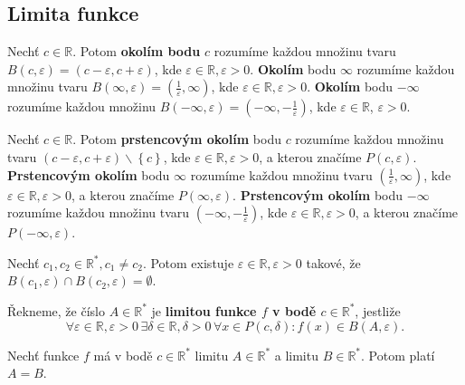 \subsection{Limita funkce}

\begin{definice}
	Nechť $c \in \mathbb R $. Potom \textbf{okolím bodu} $c$ rozumíme každou množinu tvaru
	$B(c, \varepsilon) = (c-\varepsilon, c+\varepsilon)$, kde $\varepsilon \in \mathbb R , \varepsilon > 0$.
	\textbf{Okolím} bodu $\infty$ rozumíme každou množinu tvaru $B(\infty, \varepsilon) = \left( \frac{1}{\varepsilon}, \infty \right ) $,
	kde $\varepsilon \in \mathbb R , \varepsilon > 0$. \textbf{Okolím} bodu $-\infty$
	rozumíme každou množinu $B(-\infty, \varepsilon)= \left( -\infty, -\frac{1}{\varepsilon} \right ) $, kde $\varepsilon \in \mathbb R $, $\varepsilon >0$.
\end{definice}

\begin{definice}
	Nechť $c \in \mathbb R $. Potom \textbf{prstencovým okolím} bodu $c$ rozumíme
	každou množinu tvaru $(c-\varepsilon, c+\varepsilon) \smallsetminus \left \{ c \right \} $,
	kde $\varepsilon \in \mathbb R ,\varepsilon > 0$, a kterou značíme
	$P(c,\varepsilon)$. \textbf{Prstencovým okolím} bodu $\infty$ rozumíme každou množinu tvaru $\left( \frac{1}{\varepsilon},\infty \right ) $,
	kde $\varepsilon \in \mathbb R , \varepsilon > 0$, a kterou značíme $P(\infty, \varepsilon)$.
	\textbf{Prstencovým okolím} bodu $-\infty$ rozumíme každou množinu tvaru
	$\left( -\infty, -\frac{1}{\varepsilon} \right ) $, kde $\varepsilon \in \mathbb R ,\varepsilon > 0$,
	a kterou značíme $P(-\infty, \varepsilon)$.
\end{definice}

\begin{pozorovani}
	Nechť $c_1,c_2 \in \mathbb R ^*, c_1 \ne c_2$. Potom existuje $\varepsilon \in \mathbb R , \varepsilon > 0$
	takové, že $B(c_1, \varepsilon) \cap B(c_2,\varepsilon) = \emptyset$.
\end{pozorovani}

\begin{definice}
	Řekneme, že číslo $A \in \mathbb R ^*$ je \textbf{limitou funkce $f$ v bodě $c \in \mathbb R ^*$},
	jestliže
	$$
	    \forall \varepsilon \in \mathbb R, \varepsilon > 0 \, \exists \delta \in \mathbb R , \delta > 0 \, \forall x \in P(c, \delta): f(x)\in B(A,\varepsilon).
	$$
\end{definice}

\begin{veta}\label{3.1}%
	Nechť funkce $f$ má v bodě $c\in \mathbb R ^*$ limitu $A\in \mathbb R ^*$ a limitu
	$B\in \mathbb R ^*$. Potom platí $A=B$.
\end{veta}

